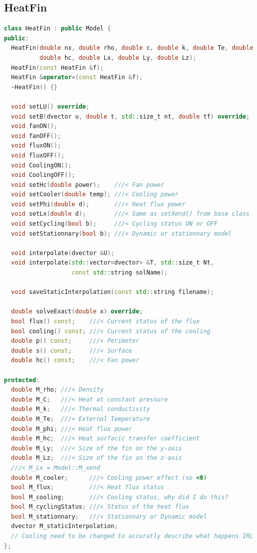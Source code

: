 \documentclass{article}
\begin{document}
\subsection{HeatFin}
\begin{lstlisting}[language=c++]
class HeatFin : public Model {
public:
  HeatFin(double nx, double rho, double c, double k, double Te, double phi,
          double hc, double Lx, double Ly, double Lz);
  HeatFin(const HeatFin &f);
  HeatFin &operator=(const HeatFin &f);
  ~HeatFin() {}

  void setLU() override;
  void setB(dvector u, double t, std::size_t nt, double tf) override;
  void fanON();
  void fanOFF();
  void fluxON();
  void fluxOFF();
  void CoolingON();
  void CoolingOFF();
  void setHc(double power);    ///< Fan power
  void setCooler(double temp); ///< Cooling power
  void setPhi(double d);       ///< Heat flux power
  void setLx(double d);        ///< Same as setXend() from base class
  void setCycling(bool b);     ///< Cycling status ON or OFF
  void setStationnary(bool b); ///< Dynamic or stationnary model

  void interpolate(dvector &U);
  void interpolate(std::vector<dvector> &T, std::size_t Nt,
                   const std::string solName);

  void saveStaticInterpolation(const std::string filename);

  double solveExact(double x) override;
  bool flux() const;    ///< Current status of the flux
  bool cooling() const; ///< Current status of the cooling
  double p() const;     ///< Perimeter
  double s() const;     ///< Surface
  double hc() const;    ///< Fan power

protected:
  double M_rho; ///< Density
  double M_C;   ///< Heat at constant pressure
  double M_k;   ///< Thermal conductivity
  double M_Te;  ///< External Temperature
  double M_phi; ///< Heat flux power
  double M_hc;  ///< Heat surfacic transfer coefficient
  double M_Ly;  ///< Size of the fin on the y-axis
  double M_Lz;  ///< Size of the fin on the z-axis
  ///< M_Lx = Model::M_xend
  double M_cooler;      ///< Cooling power effect (so <0)
  bool M_flux;          ///< Heat flux status
  bool M_cooling;       ///< Cooling status, why did I do this?
  bool M_cyclingStatus; ///< Status of the heat flux
  bool M_stationnary;   ///< Stationnary or Dynamic model
  dvector M_staticInterpolation;
  // Cooling need to be changed to accuratly describe what happens IRL
};
\end{lstlisting}
\end{document}
